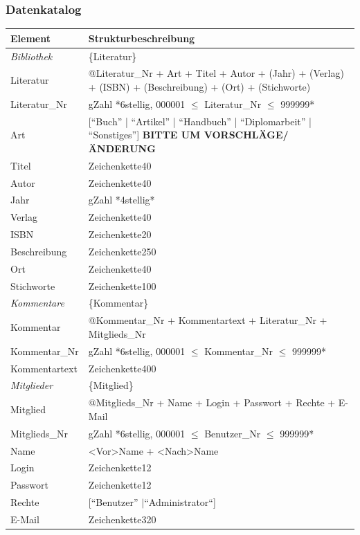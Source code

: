 \subsubsection{Datenkatalog}
\begin{longtable}{|l|p{8.5cm}|}
\hline
Element & Strukturbeschreibung \\
\hline\hline
\endhead

\emph{Bibliothek} & \{Literatur\} \\
\hline
Literatur & @Literatur\_Nr + Art + Titel + Autor + (Jahr) + (Verlag) + (ISBN) + (Beschreibung) + (Ort) + (Stichworte) \\
\hline
Literatur\_Nr & gZahl *6stellig, 000001 $\leq$ Literatur\_Nr $\leq$ 999999* \\
\hline
Art & [``Buch'' | ``Artikel'' | ``Handbuch'' | ``Diplomarbeit'' | ``Sonstiges''] \textbf{BITTE UM VORSCHLÄGE/ÄNDERUNG}\\
\hline
Titel & Zeichenkette40 \\
\hline
Autor & Zeichenkette40 \\
\hline
Jahr & gZahl *4stellig* \\
\hline
Verlag & Zeichenkette40 \\
\hline
ISBN & Zeichenkette20 \\
\hline
Beschreibung & Zeichenkette250 \\
\hline
Ort & Zeichenkette40 \\
\hline
Stichworte & Zeichenkette100 \\
\hline\hline

\emph{Kommentare} & \{Kommentar\} \\
\hline
Kommentar & @Kommentar\_Nr + Kommentartext + Literatur\_Nr + Mitglieds\_Nr\\
\hline
Kommentar\_Nr & gZahl *6stellig, 000001 $\leq$ Kommentar\_Nr $\leq$ 999999* \\
\hline
Kommentartext & Zeichenkette400 \\
\hline\hline

\emph{Mitglieder} & \{Mitglied\} \\
\hline
Mitglied  & @Mitglieds\_Nr  + Name + Login + Passwort + Rechte + E-Mail\\
\hline
Mitglieds\_Nr & gZahl *6stellig, 000001 $\leq$ Benutzer\_Nr $\leq$ 999999* \\ 
\hline
Name & <Vor>Name + <Nach>Name \\
\hline
Login & Zeichenkette12 \\
\hline
Passwort & Zeichenkette12 \\
\hline
Rechte & [``Benutzer'' $\mid $``Administrator``] \\
\hline
E-Mail & Zeichenkette320 \\
\hline\hline


\end{longtable}
